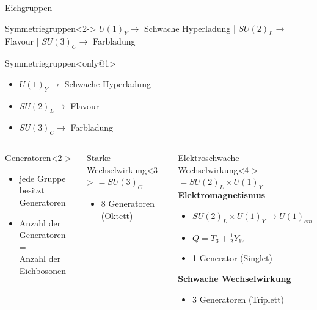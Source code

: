 \documentclass[aspectratio=169,xcolor=dvipsnames]{beamer}
\begin{document}
\begin{frame}{Eichgruppen}
    \begin{alertblock}{Symmetriegruppen}<2->
        $U(1)_Y \to$ Schwache Hyperladung | $SU(2)_L \to$ Flavour | $SU(3)_C \to$ Farbladung
    \end{alertblock}
    \begin{alertblock}{Symmetriegruppen}<only@1>
        \begin{itemize}
            \item $U(1)_Y \to$ Schwache Hyperladung
            \item $SU(2)_L \to$ Flavour
            \item $SU(3)_C \to$ Farbladung
        \end{itemize}
    \end{alertblock}
    \begin{columns}[c]
        \begin{block}{Generatoren}<2->
            \begin{itemize}
                \item jede Gruppe besitzt Generatoren
                \item Anzahl der Generatoren = \\
                      Anzahl der Eichbosonen
            \end{itemize}
        \end{block}
        \vspace{10pt}
        \begin{block}{Starke Wechselwirkung}<3->
            $= SU(3)_C$ \\
            \begin{itemize}
                \item 8 Generatoren (Oktett)
            \end{itemize}
        \end{block}
        \begin{block}{Elektroschwache Wechselwirkung}<4->
            $= SU(2)_L \times U(1)_Y$ \\
            \vspace{2pt}
            \textbf{Elektromagnetismus}
            \begin{itemize}
                \item $SU(2)_L \times U(1)_Y \to U(1)_{em}$
                \item $Q = T_3 + \frac{1}{2}Y_W$
                \item 1 Generator (Singlet)
            \end{itemize}
            \vspace{2pt}
            \textbf{Schwache Wechselwirkung}
            \begin{itemize}
                \item 3 Generatoren (Triplett)
            \end{itemize}
        \end{block}
    \end{columns}
\end{frame}
\end{document}
